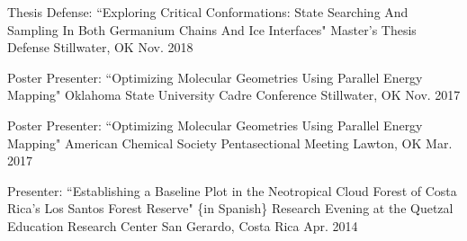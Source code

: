 

\begin{cventries}

  \cventry
    {Thesis Defense: ``Exploring Critical Conformations: State Searching And Sampling In Both Germanium Chains And Ice Interfaces"} %
    {Master's Thesis Defense} %
    {Stillwater, OK} %
    {Nov. 2018} %
    {
      \begin{cvitems} %
      \end{cvitems}
    }
	\vspace{-7.0mm}

\cventry
{Poster Presenter: ``Optimizing Molecular Geometries Using Parallel Energy Mapping"} %
{Oklahoma State University Cadre Conference} %
{Stillwater, OK} %
{Nov. 2017} %
{
	\begin{cvitems} %
	\end{cvitems}
}
\vspace{-7.0mm}

 \cventry
	{Poster Presenter: ``Optimizing Molecular Geometries Using Parallel Energy Mapping"} %
	{American Chemical Society Pentasectional Meeting} %
	{Lawton, OK} %
	{Mar. 2017} %
	{
		\begin{cvitems} %
		\end{cvitems}
	}
	\vspace{-6.0mm}

  \cventry
    {Presenter: ``Establishing a Baseline Plot in the Neotropical Cloud Forest of Costa Rica’s Los Santos Forest Reserve" \{in Spanish\}} %
    {Research Evening at the Quetzal Education Research Center} %
    {San Gerardo, Costa Rica} %
    {Apr. 2014} %
    {
      \begin{cvitems} %
      \end{cvitems}
    }
	\vspace{-6.0mm}


\end{cventries}
